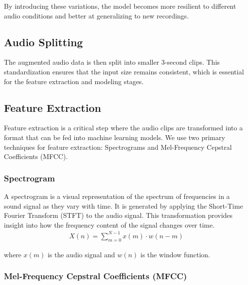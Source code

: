 By introducing these variations, the model becomes more resilient to different audio conditions and better at generalizing to new recordings.

\subsection{Audio Splitting}

The augmented audio data is then split into smaller 3-second clips. This standardization ensures that the input size remains consistent, which is essential for the feature extraction and modeling stages.

\subsection{Feature Extraction}

Feature extraction is a critical step where the audio clips are transformed into a format that can be fed into machine learning models. We use two primary techniques for feature extraction: Spectrograms and Mel-Frequency Cepstral Coefficients (MFCC).

\subsubsection{Spectrogram}

A spectrogram is a visual representation of the spectrum of frequencies in a sound signal as they vary with time. It is generated by applying the Short-Time Fourier Transform (STFT) to the audio signal. This transformation provides insight into how the frequency content of the signal changes over time.
\begin{eqnarray}
    X(n) = \sum_{m=0}^{N-1} x(m) \cdot w(n-m) 
\end{eqnarray}

where \( x(m) \) is the audio signal and \( w(n) \) is the window function.

\subsubsection{Mel-Frequency Cepstral Coefficients (MFCC)}

